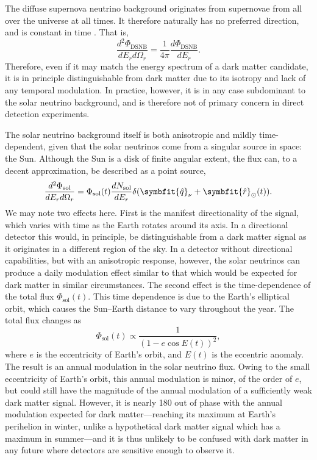 \documentclass[b5paper, 10pt, twoside]{book}
\newcommand{\der}[2]{\frac{d#1}{d#2}}
\newcommand{\ddder}[3]{\frac{d^2#1}{d#2d#3}}
\newcommand{\unitv}[1]{\symbfit{\hat{#1}}}
\begin{document}
The diffuse supernova neutrino background originates from supernovae from all over the universe at all times. It therefore naturally has no preferred direction, and is constant in time \parencite{Beacom2010}. That is,
\begin{equation}
    \ddder{\Phi_\text{DSNB}}{E_r}{\Omega_r}=\frac{1}{4\pi}\der{\Phi_\text{DSNB}}{E_r}.
\end{equation}
Therefore, even if it may match the energy spectrum of a dark matter candidate, it is in principle distinguishable from dark matter due to its isotropy and lack of any temporal modulation. In practice, however, it is in any case subdominant to the solar neutrino background, and is therefore not of primary concern in direct detection experiments.

The solar neutrino background itself is both anisotropic and mildly time-dependent, given that the solar neutrinos come from a singular source in space: the Sun. Although the Sun is a disk of finite angular extent, the flux can, to a decent approximation, be described as a point source,
\begin{equation}
    \ddder{\Phi_\text{sol}}{E_r}{\Omega_r}=\Phi_\text{sol}(t)\der{N_\text{sol}}{E_r}\delta(\unitv{q}_\nu+\unitv{r}_\odot(t)).
\end{equation}
We may note two effects here. First is the manifest directionality of the signal, which varies with time as the Earth rotates around its axis. In a directional detector this would, in principle, be distinguishable from a dark matter signal as it originates in a different region of the sky. In a detector without directional capabilities, but with an anisotropic response, however, the solar neutrinos can produce a daily modulation effect similar to that which would be expected for dark matter in similar circumstances. The second effect is the time-dependence of the total flux $\Phi_\text{sol}(t)$. This time dependence is due to the Earth's elliptical orbit, which causes the Sun--Earth distance to vary throughout the year. The total flux changes as
\begin{equation}
    \Phi_\text{sol}(t)\propto\frac{1}{(1-e\cos E(t))^2},
\end{equation}
where $e$ is the eccentricity of Earth's orbit, and $E(t)$ is the eccentric anomaly. The result is an annual modulation in the solar neutrino flux. Owing to the small eccentricity of Earth's orbit, this annual modulation is minor, of the order of $e$, but could still have the magnitude of the annual modulation of a sufficiently weak dark matter signal. However, it is nearly 180\degree{} out of phase with the annual modulation expected for dark matter---reaching its maximum at Earth's perihelion in winter, unlike a hypothetical dark matter signal which has a maximum in summer---and it is thus unlikely to be confused with dark matter in any future where detectors are sensitive enough to observe it. 
\end{document}
